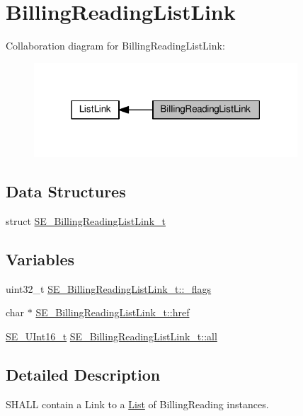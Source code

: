 \hypertarget{group__BillingReadingListLink}{}\section{Billing\+Reading\+List\+Link}
\label{group__BillingReadingListLink}
Collaboration diagram for Billing\+Reading\+List\+Link\+:\nopagebreak
\begin{figure}[H]
\begin{center}
\leavevmode
\includegraphics[width=279pt]{group__BillingReadingListLink}
\end{center}
\end{figure}
\subsection*{Data Structures}
\begin{DoxyCompactItemize}
\item 
struct \hyperlink{structSE__BillingReadingListLink__t}{S\+E\+\_\+\+Billing\+Reading\+List\+Link\+\_\+t}
\end{DoxyCompactItemize}
\subsection*{Variables}
\begin{DoxyCompactItemize}
\item 
uint32\+\_\+t \hyperlink{group__BillingReadingListLink_ga37c4ee430c1db09cacc70d0bbde77104}{S\+E\+\_\+\+Billing\+Reading\+List\+Link\+\_\+t\+::\+\_\+flags}
\item 
char $\ast$ \hyperlink{group__BillingReadingListLink_ga20c5e48e638d31cf9928d4804385b494}{S\+E\+\_\+\+Billing\+Reading\+List\+Link\+\_\+t\+::href}
\item 
\hyperlink{group__UInt16_gac68d541f189538bfd30cfaa712d20d29}{S\+E\+\_\+\+U\+Int16\+\_\+t} \hyperlink{group__BillingReadingListLink_ga7785907289146a2a194d95384465e1d9}{S\+E\+\_\+\+Billing\+Reading\+List\+Link\+\_\+t\+::all}
\end{DoxyCompactItemize}


\subsection{Detailed Description}
S\+H\+A\+LL contain a Link to a \hyperlink{structList}{List} of Billing\+Reading instances. 

